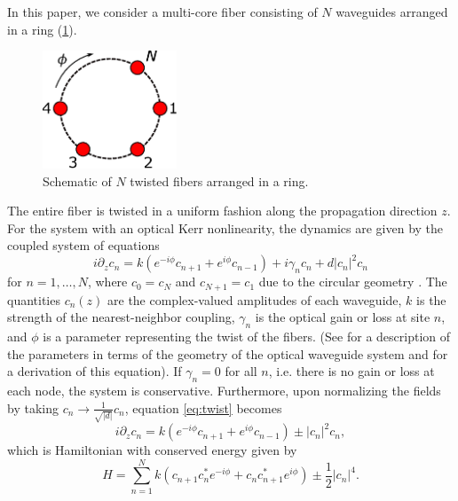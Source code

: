 \documentclass[reprint, amsmath,amssymb,aps]{revtex4-2}
\def\noi{\noindent}
\begin{document}
In this paper, we consider a multi-core fiber consisting of $N$ waveguides arranged in a ring (\cref{fig:ring}).
\begin{figure}
\begin{center}
\includegraphics[width=4cm]{circle}
\end{center}
\caption{Schematic of $N$ twisted fibers arranged in a ring.}
\label{fig:ring}
\end{figure}
\noi The entire fiber is twisted in a uniform fashion along the propagation direction $z$. For the system with an optical Kerr nonlinearity, the dynamics are given by the coupled system of equations
\begin{equation}\label{eq:twist}
i \partial_z c_n = k \left(e^{-i\phi}c_{n+1} + e^{i\phi}c_{n-1}\right) + i \gamma_n c_n + d |c_n|^2 c_n
\end{equation}
for $n = 1, \dots, N$, where $c_0 = c_{N}$ and $c_{N+1} = c_1$ due to the circular geometry \cite{castro2016,Parto2017}. The quantities $c_n(z)$ are the complex-valued amplitudes of each waveguide, $k$ is the strength of the nearest-neighbor coupling, $\gamma_n$ is the optical gain or loss at site $n$, and $\phi$ is a parameter representing the twist of the fibers. (See \cite[section 2]{castro2016} for a description of the parameters in terms of the geometry of the optical waveguide system and \cite{Longhi2007b,Garanovich2012} for a derivation of this equation). If $\gamma_n = 0$ for all $n$, i.e. there is no gain or loss at each node, the system is conservative. Furthermore, upon normalizing the fields by taking $c_n \rightarrow \frac{1}{\sqrt{|d|}}c_n$,  equation \cref{eq:twist} becomes
\begin{equation}\label{eq:twist1}
i \partial_z c_n = k \left(e^{-i\phi}c_{n+1} + e^{i\phi}c_{n-1}\right)  \pm |c_n|^2 c_n,
\end{equation}
which is Hamiltonian with conserved energy given by
\begin{equation}
H = \sum_{n=1}^N k (c_{n+1}c_n^* e^{-i \phi} + c_n c_{n+1}^* e^{i \phi}) \pm \frac{1}{2}|c_n|^4.
\end{equation}
\end{document}
